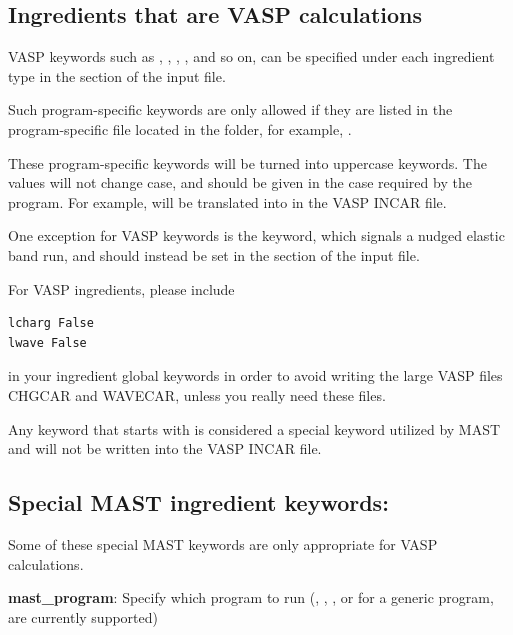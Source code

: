 \documentclass[letterpaper,10pt,english]{sphinxmanual}
\begin{document}
\subsection{Ingredients that are VASP calculations}
\label{3_0_inputfile:ingredients-that-are-vasp-calculations}
VASP keywords such as , , , , and so on, can be specified under each ingredient type in the  section of the input file.

Such program-specific keywords are only allowed if they are listed in the program-specific file located in the  folder, for example, .

These program-specific keywords will be turned into uppercase keywords. The values will not change case, and should be given in the case required by the program. For example,  will be translated into  in the VASP INCAR file.

One exception for VASP keywords is the  keyword, which signals a nudged elastic band run, and should instead be set in the  section of the input file.

For VASP ingredients, please include

\begin{Verbatim}[commandchars=\\\{\}]
lcharg False
lwave False
\end{Verbatim}

in your ingredient global keywords in order to avoid writing the large VASP files CHGCAR and WAVECAR, unless you really need these files.

Any keyword that starts with  is considered a special keyword utilized by MAST and will not be written into the VASP INCAR file.


\subsection{Special MAST ingredient keywords:}
\label{3_0_inputfile:special-mast-ingredient-keywords}
Some of these special MAST keywords are only appropriate for VASP calculations.

\textbf{mast\_program}: Specify which program to run (, , , or  for a generic program, are currently supported)
\end{document}
